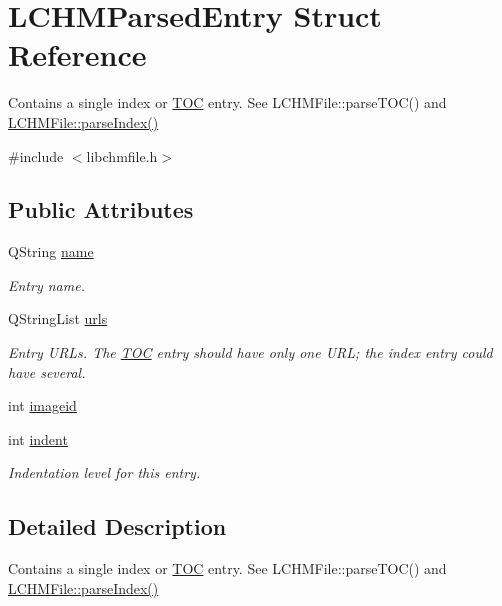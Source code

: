 \hypertarget{structLCHMParsedEntry}{\section{L\+C\+H\+M\+Parsed\+Entry Struct Reference}
\label{structLCHMParsedEntry}
}


Contains a single index or \hyperlink{classTOC}{T\+O\+C} entry. See L\+C\+H\+M\+File\+::parse\+T\+O\+C() and \hyperlink{classLCHMFile_ad93af373778e2460fa0f667b9731e76d}{L\+C\+H\+M\+File\+::parse\+Index()}  




{\ttfamily \#include $<$libchmfile.\+h$>$}

\subsection*{Public Attributes}
\begin{DoxyCompactItemize}
\item 
Q\+String \hyperlink{structLCHMParsedEntry_a90196da32bb2ed757f516caf583a6437}{name}
\begin{DoxyCompactList}\small\item\em Entry name. \end{DoxyCompactList}\item 
Q\+String\+List \hyperlink{structLCHMParsedEntry_aa871a08e7fca4ae8e23983ff299bd24f}{urls}
\begin{DoxyCompactList}\small\item\em Entry U\+R\+Ls. The \hyperlink{classTOC}{T\+O\+C} entry should have only one U\+R\+L; the index entry could have several. \end{DoxyCompactList}\item 
int \hyperlink{structLCHMParsedEntry_aefeb9372238ddebc327350e1696ec901}{imageid}
\item 
int \hyperlink{structLCHMParsedEntry_a33a145dba3dd4761f26b361dcf49017b}{indent}
\begin{DoxyCompactList}\small\item\em Indentation level for this entry. \end{DoxyCompactList}\end{DoxyCompactItemize}


\subsection{Detailed Description}
Contains a single index or \hyperlink{classTOC}{T\+O\+C} entry. See L\+C\+H\+M\+File\+::parse\+T\+O\+C() and \hyperlink{classLCHMFile_ad93af373778e2460fa0f667b9731e76d}{L\+C\+H\+M\+File\+::parse\+Index()} 

